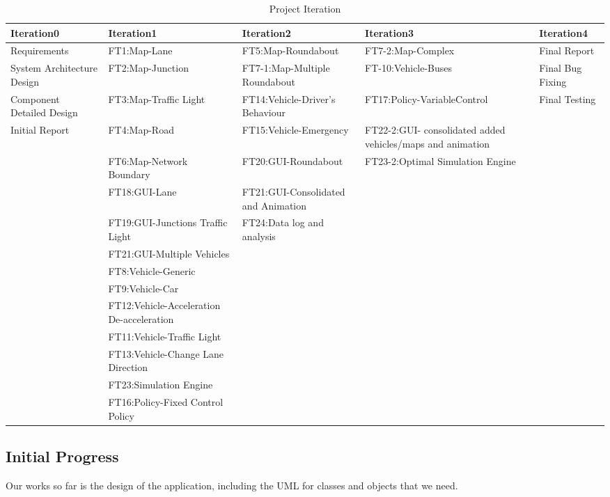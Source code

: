 \documentclass[11pt]{article}
\begin{document}
\begin{table}[h]
		\caption{Project Iteration}
		\centering
		\begin{tabular}{p{2.5cm}|p{4cm}|p{2.5cm}|p{2.5cm}|p{2cm}}
		\hline\hline
		Iteration0 & Iteration1 & Iteration2 & Iteration3 & Iteration4 \\ [0.5ex]
		\hline
		
		Requirements & FT1:Map-Lane & FT5:Map-Roundabout & FT7-2:Map-Complex & Final Report\\[1ex]
		
		System Architecture Design & FT2:Map-Junction & FT7-1:Map-Multiple Roundabout & FT-10:Vehicle-Buses & Final Bug Fixing\\ [1ex]
		
		Component Detailed Design & FT3:Map-Traffic Light & FT14:Vehicle-Driver's Behaviour & FT17:Policy-VariableControl & Final Testing\\ [1ex]
		
		Initial Report & FT4:Map-Road & FT15:Vehicle-Emergency & FT22-2:GUI- consolidated added vehicles/maps and animation \\[1ex]
		
		& FT6:Map-Network Boundary & FT20:GUI-Roundabout & FT23-2:Optimal Simulation Engine \\[1ex] 
		
		& FT18:GUI-Lane & FT21:GUI-Consolidated and Animation & \\[1ex]
		
		& FT19:GUI-Junctions Traffic Light & FT24:Data log and analysis & &\\[1ex]
		& FT21:GUI-Multiple Vehicles &&&\\
		& FT8:Vehicle-Generic &&& \\
		& FT9:Vehicle-Car &&& \\
		& FT12:Vehicle-Acceleration De-acceleration &&& \\
		& FT11:Vehicle-Traffic Light &&& \\
		& FT13:Vehicle-Change Lane Direction &&& \\
		& FT23:Simulation Engine &&& \\
		& FT16:Policy-Fixed Control Policy &&&\\
		
		
		
		\hline
		\end{tabular}
		\label{table:iteration} 
		\end{table}

	
\subsection{Initial Progress}
Our works so far is the design of the application, including the UML for classes and objects that we need. 
\end{document}
